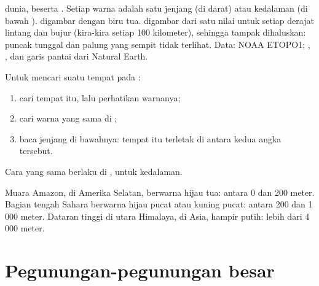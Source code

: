 \begin{omfigure}
{\small {} dunia, beserta . Setiap warna adalah satu
jenjang  (di darat) atau kedalaman (di bawah ). 
digambar dengan biru tua.  digambar dari satu nilai untuk setiap
derajat lintang dan bujur (kira-kira setiap 100 kilometer), sehingga
tampak dihaluskan: puncak tunggal dan palung yang sempit tidak terlihat.
Data:  NOAA ETOPO1; , , dan garis pantai dari Natural
Earth.}
\label{fig:g4:world-physical-map:map}
\end{omfigure}

\begin{method}\label{met:g4:world-physical-map:reading}
Untuk mencari  suatu tempat pada :
\begin{enumerate}
  \item cari tempat itu, lalu perhatikan warnanya;
  \item cari warna yang sama di ;
  \item baca jenjang di bawahnya:  tempat itu terletak di antara
        kedua angka tersebut.
\end{enumerate}
Cara yang sama berlaku di , untuk kedalaman.
\end{method}

\begin{example}\label{ex:g4:world-physical-map:three}
Muara  Amazon, di  Amerika Selatan, berwarna hijau tua:
 antara 0 dan 200 meter. Bagian tengah Sahara berwarna hijau
pucat atau kuning pucat: antara 200 dan 1\,000 meter. Dataran tinggi di
utara Himalaya, di Asia, hampir putih: lebih dari 4\,000 meter.
\end{example}

\section{Pegunungan-pegunungan besar}

